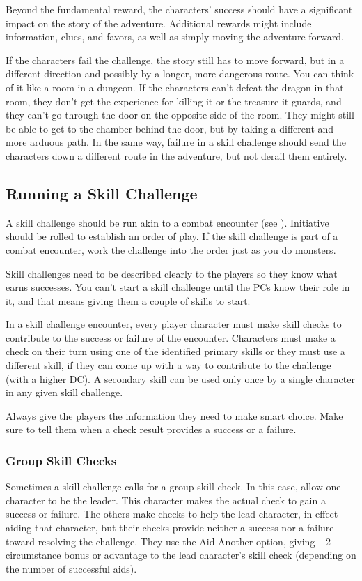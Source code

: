 Beyond the fundamental reward, the characters' success should have a significant impact on the story of the adventure. Additional rewards might include information, clues, and favors, as well as simply moving the adventure forward.

If the characters fail the challenge, the story still has to move forward, but in a different direction and possibly by a longer, more dangerous route. You can think of it like a room in a dungeon. If the characters can't defeat the dragon in that room, they don't get the experience for killing it or the treasure it guards, and they can't go through the door on the opposite side of the room. They might still be able to get to the chamber behind the door, but by taking a different and more arduous path. In the same way, failure in a skill challenge should send the characters down a different route in the adventure, but not derail them entirely.

\subsection{Running a Skill Challenge}
A skill challenge should be run akin to a combat encounter (see ). Initiative should be rolled to establish an order of play. If the skill challenge is part of a combat encounter, work the challenge into the order just as you do monsters.

Skill challenges need to be described clearly to the players so they know what earns successes. You can't start a skill challenge until the PCs know their role in it, and that means giving them a couple of skills to start.

In a skill challenge encounter, every player character must make skill checks to contribute to the success or failure of the encounter. Characters must make a check on their turn using one of the identified primary skills or they must use a different skill, if they can come up with a way to contribute to the challenge (with a higher DC). A secondary skill can be used only once by a single character in any given skill challenge.

Always give the players the information they need to make smart choice. Make sure to tell them when a check result provides a success or a failure.

\subsubsection{Group Skill Checks}
Sometimes a skill challenge calls for a group skill check. In this case, allow one character to be the leader. This character makes the actual check to gain a success or failure. The others make checks to help the lead character, in effect aiding that character, but their checks provide neither a success nor a failure toward resolving the challenge. They use the Aid Another option, giving +2 circumstance bonus or advantage to the lead character's skill check (depending on the number of successful aids).

